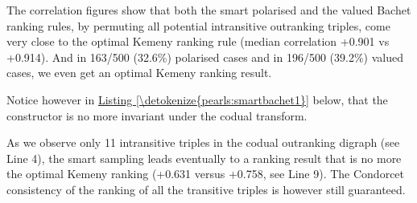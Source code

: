 \documentclass[a4paper,12pt,english]{sphinxhowto}
\begin{document}
\sphinxAtStartPar
The correlation figures show that both the smart polarised and the valued Bachet ranking rules, by permuting all potential intransitive outranking triples, come very close to the optimal Kemeny ranking rule (median correlation +0.901 vs +0.914). And in 163/500 (32.6\%) polarised cases and in 196/500 (39.2\%) valued cases, we even get an optimal Kemeny ranking result.

\sphinxAtStartPar
Notice however in \hyperref[\detokenize{pearls:smartbachet1}]{Listing \ref{\detokenize{pearls:smartbachet1}}} below, that the  constructor is no more invariant under the codual transform.
\def\sphinxLiteralBlockLabel{\label{\detokenize{pearls:smartbachet1}}}
%
\begin{sphinxVerbatim}[commandchars=\\\{\},numbers=left,firstnumber=1,stepnumber=1]
  
  
\end{sphinxVerbatim}
\sphinxresetverbatimhllines

\sphinxAtStartPar
As we observe only 11 intransitive triples in the codual outranking digraph  (see Line 4), the smart sampling leads eventually to a ranking result that is no more the optimal Kemeny ranking (+0.631 versus +0.758, see Line 9). The Condorcet consistency of the ranking of all the transitive triples is however still guaranteed.
\end{document}
